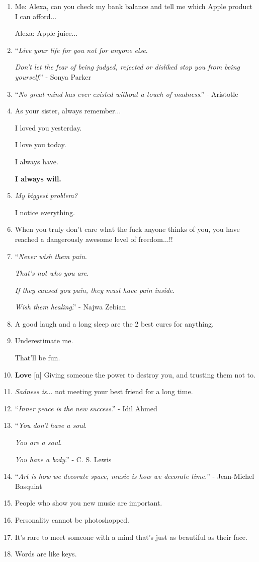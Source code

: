 \documentclass{article}
\numberwithin{equation}{section}
\begin{document}
\begin{enumerate}
    Over everyone else, under any circumstances.
    \item Me: Alexa, can you check my bank balance and tell me which Apple product I can afford$\ldots$
    
    Alexa: Apple juice$\ldots$
    \item ``\textit{Live your life for you not for anyone else}.
    
    \textit{Don't let the fear of being judged, rejected or disliked stop you from being yourself}.'' - Sonya Parker
    \item ``\textit{No great mind has ever existed without a touch of madness}.'' - Aristotle
    \item As your sister, always remember$\ldots$
    
    I loved you yesterday.
    
    I love you today.
    
    I always have.
    
    \textbf{I always will.}
    \item \textit{My biggest problem?}
    
    I notice everything.
    \item When you truly don't care what the fuck anyone thinks of you, you have reached a dangerously awesome level of freedom$\ldots$!!
    \item ``\textit{Never wish them pain}.
    
    \textit{That's not who you are}.
    
    \textit{If they caused you pain, they must have pain inside}.
    
    \textit{Wish them healing}.'' - Najwa Zebian
    \item A good laugh and a long sleep are the 2 best cures for anything.
    \item Underestimate me.
    
    That'll be fun.
    \item \textbf{Love} [n] Giving someone the power to destroy you, and trusting them not to.
    \item \textit{Sadness is}$\ldots$ not meeting your best friend for a long time.
    \item ``\textit{Inner peace is the new success}.'' - Idil Ahmed
    \item ``\textit{You don't have a soul}.
    
    \textit{You are a soul}.
    
    \textit{You have a body}.'' - C. S. Lewis
    \item ``\textit{Art is how we decorate space, music is how we decorate time.}'' - Jean-Michel Basquiat
    \item People who show you new music are important.
    \item Personality cannot be photoshopped.
    \item It's rare to meet someone with a mind that's just as beautiful as their face.
    \item Words are like keys.
    

\end{enumerate}
\end{document}
